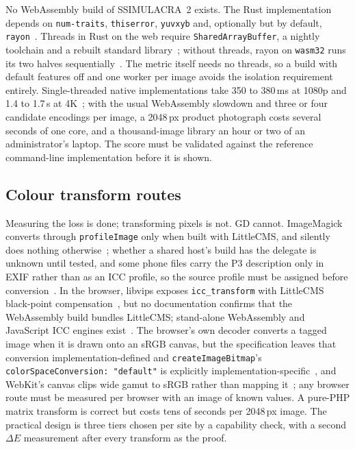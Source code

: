 \documentclass[sigconf,nonacm,screen]{acmart}
\begin{document}
No WebAssembly build of SSIMULACRA~2 exists. The Rust implementation depends on \texttt{num-traits}, \texttt{thiserror}, \texttt{yuvxyb} and, optionally but by default, \texttt{rayon}~\cite{rustavssimulacra2}. Threads in Rust on the web require \texttt{SharedArrayBuffer}, a nightly toolchain and a rebuilt standard library~\cite{wasmbindgenrayon}; without threads, rayon on \texttt{wasm32} runs its two halves sequentially~\cite{rayoncore}. The metric itself needs no threads, so a build with default features off and one worker per image avoids the isolation requirement entirely. Single-threaded native implementations take 350 to 380\,ms at 1080p and 1.4 to 1.7\,s at 4K~\cite{zensim}; with the usual WebAssembly slowdown and three or four candidate encodings per image, a 2048\,px product photograph costs several seconds of one core, and a thousand-image library an hour or two of an administrator's laptop. The score must be validated against the reference command-line implementation before it is shown.

\subsection{Colour transform routes}

Measuring the loss is done; transforming pixels is not. GD cannot. ImageMagick converts through \texttt{profileImage} only when built with LittleCMS, and silently does nothing otherwise~\cite{phpimagick}; whether a shared host's build has the delegate is unknown until tested, and some phone files carry the P3 description only in EXIF rather than as an ICC profile, so the source profile must be assigned before conversion~\cite{imagemagickp3}. In the browser, libvips exposes \texttt{icc\_transform} with LittleCMS black-point compensation~\cite{libvipsicc}, but no documentation confirms that the WebAssembly build bundles LittleCMS; stand-alone WebAssembly and JavaScript ICC engines exist~\cite{lcmswasm,jscolorengine}. The browser's own decoder converts a tagged image when it is drawn onto an sRGB canvas, but the specification leaves that conversion implementation-defined and \texttt{createImageBitmap}'s \texttt{colorSpaceConversion: "default"} is explicitly implementation-specific~\cite{mdncreateimagebitmap}, and WebKit's canvas clips wide gamut to sRGB rather than mapping it~\cite{webkitwidegamut}; any browser route must be measured per browser with an image of known values. A pure-PHP matrix transform is correct but costs tens of seconds per 2048\,px image. The practical design is three tiers chosen per site by a capability check, with a second $\Delta E$ measurement after every transform as the proof.
\end{document}
